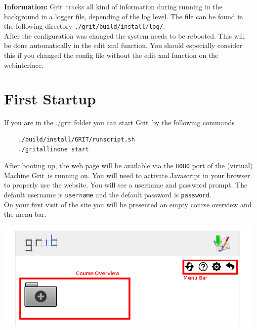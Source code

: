 \documentclass[10pt,a4paper, titlepage, toc=idx]{scrreprt}
\theoremstyle{definition}
\theoremstyle{plain}
\newcommand*{\product}{Grit}
\begin{document}
\noindent \textbf{Information: } \product\ tracks all kind of information during running in the background in a logger file, depending of the log level. The file can be found in the following directory \texttt{./grit/build/install/log/}.\\

\noindent After the configuration was changed the system needs to be rebooted. This will be done automatically in the edit xml function. You should especially consider this if you changed the config file without the edit xml function on the webinterface.
	
	\section{First Startup}
If you are in the ./grit folder you can start \product\ by the following commands 

\begin{lstlisting}
	./build/install/GRIT/runscript.sh
	./gritallinone start
\end{lstlisting}

After booting up, the web page will be available via the {\tt 8080} port of the (virtual) Machine \product\ is running on. You will need to activate Javascript in your browser to properly use the website.  You will see a username and password prompt. The default username is \texttt{username} and the default password is \texttt{password}. \\
	
	
On your first visit of the site you will be presented an empty course overview and the menu bar.
\begin{center}
	\includegraphics[width=.6\textwidth]{pictures/home.png}
\end{center}
\end{document}
